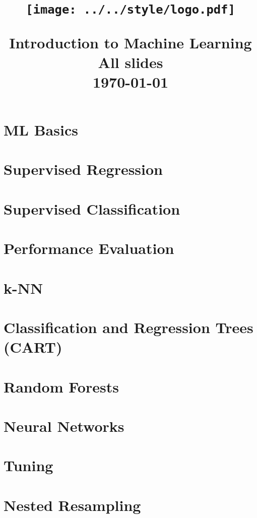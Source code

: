 \documentclass[11pt,compress]{beamer}
\title{
\centerline{\texttt{[image: ../../style/logo.pdf]}}
\medskip
Introduction to Machine Learning \\
\medskip
\small All slides \\
\bigskip
\small \today
}
\begin{document}

\begin{frame}
\maketitle
\end{frame}



\section{ML Basics}


\section{Supervised Regression}


\section{Supervised Classification}


\section{Performance Evaluation}


\section{k-NN}


\section{Classification and Regression Trees (CART)}


\section{Random Forests}


\section{Neural Networks}


\section{Tuning}


\section{Nested Resampling}


%
\end{document}
